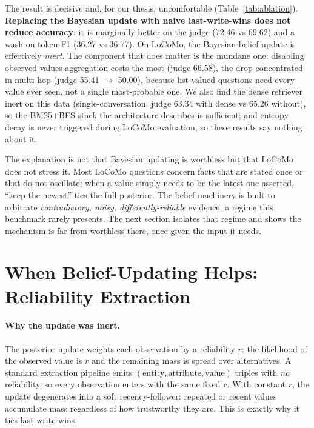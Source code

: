 \documentclass[11pt,a4paper,twocolumn]{article}
\begin{document}
The result is decisive and, for our thesis, uncomfortable
(Table~\ref{tab:ablation}). \textbf{Replacing the Bayesian update with naive
last-write-wins does not reduce accuracy}: it is marginally better on the judge
(72.46 vs 69.62) and a wash on token-F1 (36.27 vs 36.77). On LoCoMo, the
Bayesian belief update is effectively \emph{inert}. The component that does
matter is the mundane one: disabling observed-values aggregation costs the most
(judge 66.58), the drop concentrated in multi-hop (judge 55.41 $\rightarrow$
50.00), because list-valued questions need every value ever seen, not a single
most-probable one. We also find the dense retriever inert on this data
(single-conversation: judge 63.34 with dense vs 65.26 without), so the BM25+BFS
stack the architecture describes is sufficient; and entropy decay is never
triggered during LoCoMo evaluation, so these results say nothing about it.

The explanation is not that Bayesian updating is worthless but that LoCoMo does
not stress it. Most LoCoMo questions concern facts that are stated once or that
do not oscillate; when a value simply needs to be the latest one asserted,
``keep the newest'' ties the full posterior. The belief machinery is built to
arbitrate \emph{contradictory, noisy, differently-reliable} evidence, a regime
this benchmark rarely presents. The next section isolates that regime and shows
the mechanism is far from worthless there, once given the input it needs.

\section{When Belief-Updating Helps: Reliability Extraction}
\label{sec:reliability}

\paragraph{Why the update was inert.}
The posterior update weights each observation by a reliability $r$: the
likelihood of the observed value is $r$ and the remaining mass is spread over
alternatives. A standard extraction pipeline emits
$(\text{entity},\text{attribute},\text{value})$ triples with \emph{no}
reliability, so every observation enters with the same fixed $r$. With constant
$r$, the update degenerates into a soft recency-follower: repeated or recent
values accumulate mass regardless of how trustworthy they are. This is exactly
why it ties last-write-wins.
\end{document}
